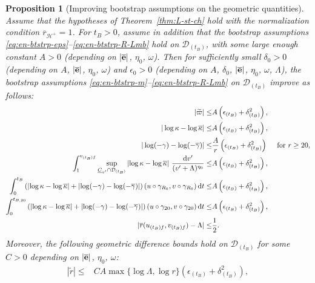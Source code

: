 \documentclass[10pt, reqno]{amsart}
\newtheorem{proposition}[theorem]{Proposition}
\theoremstyle{definition}
\theoremstyle{remark}
\theoremstyle{conjecture}
\numberwithin{equation}{section}
\newcommand{\abs}[1]{\vert#1\vert}
\newcommand{\set}[1]{\{#1\}}
\newcommand{\ud}{\mathrm{d}}
\newcommand{\0}{\emptyset}
\newcommand{\gmm}{\gamma}
\newcommand{\dlt}{\delta}
\newcommand{\eps}{\epsilon}
\newcommand{\kpp}{\kappa}
\newcommand{\lmb}{\lambda}
\newcommand{\Lmb}{\Lambda}
\newcommand{\omg}{\omega}
\newcommand{\bfe}{{\bf e}}
\newcommand{\calD}{\mathcal D}
\newcommand{\calH}{\mathcal H}
\newcommand{\uC}{\underline{C}}
\newcommand{\dur}{\nu}
\newcommand{\dvr}{\lmb}
\newcommand{\f}{\frac}
\newcommand{\EH}{\calH^{+}}
\newcommand{\e}{\bfe}							%
\newcommand{\rbg}{\overline{r}}					%
\newcommand{\varpibg}{\overline{\varpi}}				%
\newcommand{\kppbg}{\overline{\kpp}}					%
\newcommand{\gmmbg}{\overline{\gmm}}					%
\newcommand{\ebg}{\overline{\e}}					%
\newcommand{\rdf}{\widetilde{r}}					%
\newcommand{\varpidf}{\widetilde{\varpi}}				%
\newcommand{\Abs}[1]{\left\vert #1 \right\vert}
\begin{document}
\begin{proposition} [Improving bootstrap assumptions on the geometric quantities] \label{prop:en-btstrp}
Assume that the hypotheses of Theorem~\ref{thm:L-st-ch} hold with the normalization condition $\rbg_{\EH}=1$. For $t_{B} > 0$, assume in addition that the bootstrap assumptions \eqref{eq:en-btstrp-eps}--\eqref{eq:en-btstrp-R-Lmb} 
 hold on $\calD_{(t_{B})}$, with some large enough constant $A > 0$ (depending on $|\ebg|$, $\eta_{0}$, $\omg$). Then for sufficiently small $\dlt_{0} > 0$ (depending on $A$, $\abs{\ebg}$, $\eta_{0}$, $\omg$) and $\eps_0 > 0$ (depending on $A$, $\dlt_0$, $\abs{\ebg}$, $\eta_{0}$, $\omg$, $\Lmb$), the bootstrap assumptions \eqref{eq:en-btstrp-m}--\eqref{eq:en-btstrp-R-Lmb} on $\calD_{(t_{B})}$ improve as follows:
\begin{align} 
	\abs{\varpidf} \leq& A \left( \eps_{(t_{B})} + \dlt_{(t_{B})}^{2} \right),  \label{eq:en-btstrp-m:imp} \\
	\abs{\log \kpp - \log \kppbg} \leq&  A \left( \eps_{(t_{B})} + \dlt_{(t_{B})}^{2} \right), \label{eq:en-btstrp-kpp:imp}\\
	\abs{\log (-\gmm) - \log (-\gmmbg)} \leq&  \frac{A}{r} \left( \eps_{(t_{B})} + \dlt_{(t_{B})}^{2} \right)  \quad \hbox{ for } r \geq 20, \label{eq:en-btstrp-gmm:imp}	\\
	\int_{1}^{v_{(t_{B}) f}} \sup_{\uC_{v'} \cap \calD_{(t_{B})}} \Abs{\log \kpp - \log \kppbg} \, \frac{\ud v'}{(v' + \Lmb)^{\eta_{0}}}
	\leq &  A \left( \eps_{(t_{B})} + \dlt_{(t_{B})}^{2} \right), \label{eq:en-btstrp-kpp-int:imp}\\
	\int_{0}^{t_{B}} \left( \Abs{\log \kpp - \log \kppbg} + \Abs{\log (-\gmm) - \log (-\gmmbg)} \right)(u \circ \gmm_{R_{0}}, v \circ \gmm_{R_{0}}) \, \ud t
	\leq &  A \left( \eps_{(t_{B})} + \dlt_{(t_{B})}^{2} \right),	\label{eq:en-btstrp-int:imp} \\
	\int_{0}^{t_{B, 20}} \left( \Abs{\log \kpp - \log \kppbg} + \Abs{\log (-\gmm) - \log (-\gmmbg)} \right)(u \circ \gmm_{20}, v \circ \gmm_{20}) \, \ud t
	\leq & A \left( \eps_{(t_{B})} + \dlt_{(t_{B})}^{2} \right),	\label{eq:en-btstrp-int-20:imp} \\
	|\rbg(u_{(t_B)f}, v_{(t_B)f}) - \Lambda |\leq & \f 12. \label{eq:en-btstrp-R-Lmb:imp}
\end{align}
Moreover, the following geometric difference bounds hold on $\calD_{(t_{B})}$ for some $C>0$ depending on $|\ebg|$, $\eta_0$, $\omg$:
\begin{align}
\Abs{\rdf} \leq & C A \max\set{\log \Lmb, \log r} \left( \eps_{(t_{B})} + \dlt_{(t_{B})}^{2}\right), \label{eq:en-btstrp:rdf} \\

\end{align}
\end{proposition}
\end{document}
